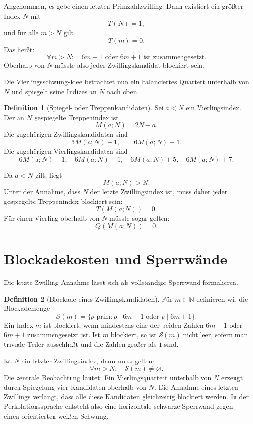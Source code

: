 \documentclass[11pt,a4paper]{article}
\theoremstyle{definition}
\newtheorem{definition}{Definition}
\newcommand{\N}{\mathbb{N}}
\begin{document}
Angenommen, es gebe einen letzten Primzahlzwilling. Dann existiert ein größter Index $N$ mit
\[
T(N)=1,
\]
und für alle $m>N$ gilt
\[
T(m)=0.
\]
Das heißt:
\[
\forall m>N:\quad 6m-1 \text{ oder } 6m+1 \text{ ist zusammengesetzt.}
\]
Oberhalb von $N$ müsste also jeder Zwillingskandidat blockiert sein.

Die Vierlingsschwung-Idee betrachtet nun ein balanciertes Quartett unterhalb von $N$ und spiegelt seine Indizes an $N$ nach oben.

\begin{definition}[Spiegel- oder Treppenkandidaten]
Sei $a<N$ ein Vierlingsindex. Der an $N$ gespiegelte Treppenindex ist
\[
M(a;N)=2N-a.
\]
Die zugehörigen Zwillingskandidaten sind
\[
6M(a;N)-1,\qquad 6M(a;N)+1.
\]
Die zugehörigen Vierlingskandidaten sind
\[
6M(a;N)-1,\quad 6M(a;N)+1,\quad 6M(a;N)+5,\quad 6M(a;N)+7.
\]
\end{definition}

Da $a<N$ gilt, liegt
\[
M(a;N)>N.
\]
Unter der Annahme, dass $N$ der letzte Zwillingsindex ist, muss daher jeder gespiegelte Treppenindex blockiert sein:
\[
T(M(a;N))=0.
\]
Für einen Vierling oberhalb von $N$ müsste sogar gelten:
\[
Q(M(a;N))=0.
\]

\section{Blockadekosten und Sperrwände}

Die letzte-Zwilling-Annahme lässt sich als vollständige Sperrwand formulieren.

\begin{definition}[Blockade eines Zwillingskandidaten]
Für $m\in\N$ definieren wir die Blockademenge
\[
\mathcal{S}(m)=\{p\text{ prim}: p\mid 6m-1 \text{ oder } p\mid 6m+1\}.
\]
Ein Index $m$ ist blockiert, wenn mindestens eine der beiden Zahlen $6m-1$ oder $6m+1$ zusammengesetzt ist. Ist $m$ blockiert, so ist $\mathcal{S}(m)$ nicht leer, sofern man triviale Teiler ausschließt und die Zahlen größer als $1$ sind.
\end{definition}

Ist $N$ ein letzter Zwillingsindex, dann muss gelten:
\[
\forall m>N:\quad \mathcal{S}(m)\neq\varnothing.
\]
Die zentrale Beobachtung lautet: Ein Vierlingsquartett unterhalb von $N$ erzeugt durch Spiegelung vier Kandidaten oberhalb von $N$. Die Annahme eines letzten Zwillings verlangt, dass alle diese Kandidaten gleichzeitig blockiert werden. In der Perkolationssprache entsteht also eine horizontale schwarze Sperrwand gegen einen orientierten weißen Schwung.
\end{document}
